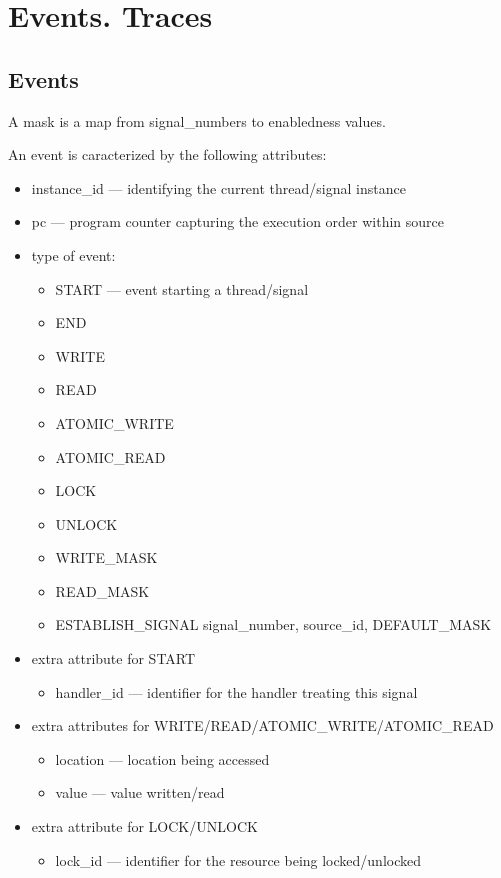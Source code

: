 \documentclass{article}
\begin{document}
\section{Events. Traces}

\subsection{Events}

A mask is a map from signal\_numbers to enabledness values.

An event is caracterized by the following attributes:

\begin{itemize}
\item instance\_id --- identifying the current thread/signal instance  
\item pc --- program counter capturing the execution order within source
\item type of event: 
\begin{itemize}
\item START --- event starting a thread/signal
\item END 
\item WRITE
\item READ
\item ATOMIC\_WRITE
\item ATOMIC\_READ
\item LOCK
\item UNLOCK
\item WRITE\_MASK
\item READ\_MASK
\item ESTABLISH\_SIGNAL signal\_number, source\_id, DEFAULT\_MASK 
\end{itemize}
\item extra attribute for START
\begin{itemize}
  \item handler\_id --- identifier for the handler treating this signal
\end{itemize}
\item extra attributes for WRITE/READ/ATOMIC\_WRITE/ATOMIC\_READ
\begin{itemize}
\item location --- location being accessed
\item value --- value written/read
\end{itemize}
\item extra attribute for LOCK/UNLOCK
\begin{itemize}
\item lock\_id --- identifier for the resource being locked/unlocked

\end{itemize}
\end{itemize}
\end{document}
